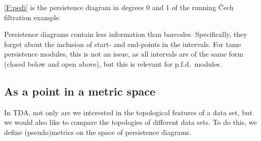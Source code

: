\begin{example}
  \cref{F:pedi} is the persistence diagram in degrees $0$ and $1$ of the running Čech filtration example.
\end{example}

\begin{remark}
  Persistence diagrams contain less information than barcodes. Specifically, they forget about the inclusion of start- and end-points in the intervals. For tame persistence modules, this is not an issue, as all intervals are of the same form (closed below and open above), but this is relevant for p.f.d.\ modules.
\end{remark}

\subsection{As a point in a metric space}
\label{SS:metrics}

In TDA, not only are we interested in the topological features of a data set, but we would also like to compare the topologies of different data sets. To do this, we define (pseudo)metrics on the space of persistence diagrams.

